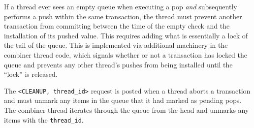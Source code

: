 If a thread ever sees an empty queue when executing a pop \emph{and} subsequently performs a push within the same transaction, the thread must prevent another transaction from committing between the time of the empty check and the installation of its pushed value. This requires adding what is essentially a lock of the tail of the queue. This is implemented via additional machinery in the combiner thread code, which signals whether or not a transaction has locked the queue and prevents any other thread's pushes from being installed until the ``lock'' is released.

The \texttt{<CLEANUP, thread\_id>} request is posted when a thread aborts a transaction and must unmark any items in the queue that it had marked as pending pops. The combiner thread iterates through the queue from the head and unmarks any items with the \texttt{thread\_id}.

